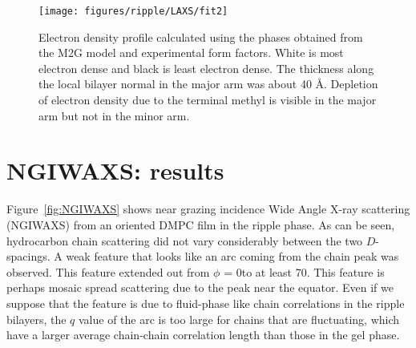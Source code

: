 \begin{figure}[htbp]
  \centering
  \texttt{[image: figures/ripple/LAXS/fit2]}
  \caption[Electron density profile calculated using the phases obtained from the M2G
  model and experimental form factors]
  {Electron density profile calculated using the phases obtained from the M2G
  model and experimental form factors. White is most electron dense and
  black is least electron dense. The thickness along the local bilayer normal
  in the major arm was about 40 \AA. Depletion of electron density due to
  the terminal methyl is visible in the major arm but not in the minor arm.}
  \label{fig:fit2}
\end{figure}




\section{NGIWAXS: results}\label{sec:NGIWAXS_results}
Figure~\ref{fig:NGIWAXS} shows near grazing incidence Wide Angle X-ray
scattering (NGIWAXS) from an oriented DMPC film in the ripple phase.
As can be seen, hydrocarbon chain scattering did not vary considerably
between the two $D$-spacings. A weak feature that looks like an 
arc coming from the chain peak was observed. This feature extended
out from $\phi$ = 0\textdegree to at least 70\textdegree. This feature
is perhaps mosaic spread scattering due to the peak near the equator.
Even if we suppose that the feature is due to fluid-phase like chain
correlations in the ripple bilayers, the $q$ value of the arc is too
large for chains that are fluctuating, which have a larger average 
chain-chain correlation length than those in the gel phase.

